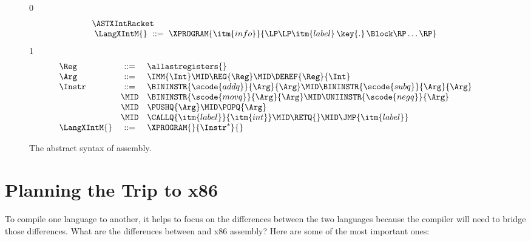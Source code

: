 \documentclass[7x10]{TimesAPriori_MIT}%
\def\racketEd{0}
\def\pythonEd{1}
\def\edition{1}
\newcommand{\pythonColor}[0]{}
\numberwithin{theorem}{chapter}
\numberwithin{definition}{chapter}
\numberwithin{equation}{chapter}
\begin{document}
\begin{figure}[tp]
\begin{tcolorbox}[colback=white]
\small
{\if\edition\racketEd
\[\arraycolsep=3pt
\begin{array}{l}
  \ASTXIntRacket \\
\begin{array}{lcl}
\LangXIntM{} &::= & \XPROGRAM{\itm{info}}{\LP\LP\itm{label} \,\key{.}\, \Block \RP\ldots\RP}
\end{array}
\end{array}
\]
\fi}
{\if\edition\pythonEd\pythonColor
\[
\begin{array}{lcl}
\Reg &::=& \allastregisters{} \\
\Arg &::=&  \IMM{\Int} \MID \REG{\Reg}
   \MID \DEREF{\Reg}{\Int} \\
\Instr &::=& \BININSTR{\scode{addq}}{\Arg}{\Arg} 
       \MID \BININSTR{\scode{subq}}{\Arg}{\Arg} \\
       &\MID& \BININSTR{\scode{movq}}{\Arg}{\Arg}
       \MID \UNIINSTR{\scode{negq}}{\Arg}\\
       &\MID&  \PUSHQ{\Arg} \MID \POPQ{\Arg} \\
       &\MID& \CALLQ{\itm{label}}{\itm{int}} \MID \RETQ{}  \MID \JMP{\itm{label}} \\
\LangXIntM{} &::= & \XPROGRAM{}{\Instr^{*}}{}
\end{array}
\]
\fi}
\end{tcolorbox}
\caption{The abstract syntax of \LangXInt{} assembly.}
\label{fig:x86-int-ast}
\end{figure}

\section{Planning the Trip to x86}
\label{sec:plan-s0-x86}

To compile one language to another, it helps to focus on the
differences between the two languages because the compiler will need
to bridge those differences. What are the differences between \LangVar{}
and x86 assembly? Here are some of the most important ones:
\end{document}
